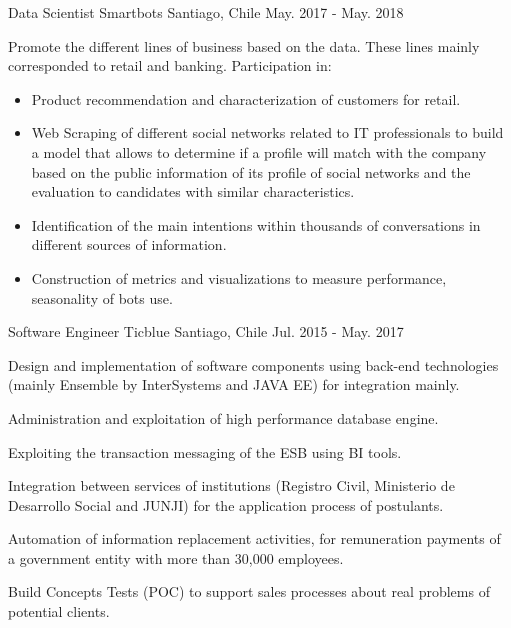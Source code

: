 \begin{cventries}
  \cventry
    {Data Scientist} %
    {Smartbots} %
    {Santiago, Chile} %
    {May. 2017 - May. 2018} %
    {
      \begin{cvitems} %
        \item {Promote the different lines of business based on the data. These lines mainly corresponded to retail and banking. Participation in:}
      	\begin{itemize}
        	\item{Product recommendation and characterization of customers for retail.}
        	\item{Web Scraping of different social networks related to IT professionals to build a model that allows to determine if a profile will match with the company based on the public information of its profile of social networks and the evaluation to candidates with similar characteristics.}
        	\item{Identification of the main intentions within thousands of conversations in different sources of information.}
        	\item{Construction of metrics and visualizations to measure performance, seasonality of bots use.}
      	\end{itemize}
      \end{cvitems}
    }

  \cventry
    {Software Engineer} %
    {Ticblue} %
    {Santiago, Chile} %
    {Jul. 2015 - May. 2017} %
    {
      \begin{cvitems} %
        \item {Design and implementation of software components using back-end technologies (mainly Ensemble by InterSystems and JAVA EE) for integration mainly.}
        \item {Administration and exploitation of high performance database engine.}
        \item {Exploiting the transaction messaging of the ESB using BI tools.}
        \item {Integration between services of institutions (Registro Civil, Ministerio de Desarrollo Social and JUNJI) for the application process of postulants.}
        \item {Automation of information replacement activities, for remuneration payments of a government entity with more than 30,000 employees.}
        \item {Build Concepts Tests (POC) to support sales processes about real problems of potential clients.}
      \end{cvitems}
    }

\end{cventries}
